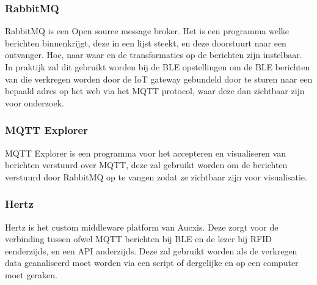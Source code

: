 \subsubsection{RabbitMQ}
RabbitMQ is een Open source message broker. Het is een programma welke berichten binnenkrijgt, deze in een lijst steekt, en deze doorstuurt naar een ontvanger. Hoe, naar waar en de transformaties op de berichten zijn instelbaar. In praktijk zal dit gebruikt worden bij de BLE opstellingen om de BLE berichten van die verkregen worden door de IoT gateway gebundeld door te sturen naar een bepaald adres op het web via het MQTT protocol, waar deze dan zichtbaar zijn voor onderzoek.\autocite{RabbitMQ2022}

\subsubsection{MQTT Explorer}
MQTT Explorer is een programma voor het accepteren en visualiseren van berichten verstuurd over MQTT, deze zal gebruikt worden om de berichten verstuurd door RabbitMQ op te vangen zodat ze zichtbaar zijn voor visualisatie.\autocite{Nordquist2019}

\subsubsection{Hertz}
Hertz is het custom middleware platform van Aucxis. Deze zorgt voor de verbinding tussen ofwel MQTT berichten bij BLE en de lezer bij RFID eenderzijds, en een API anderzijds. Deze zal gebruikt worden als de verkregen data geanaliseerd moet worden via een script of dergelijke en op een computer moet geraken.\autocite{Hertz2020}